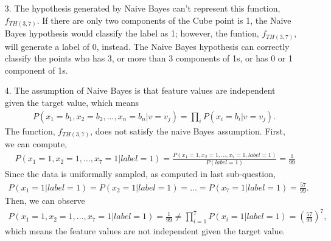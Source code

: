 \documentclass[11pt]{article}
\begin{document}
\begin{itemize}
\item[3.] The hypothesis generated by Naive Bayes can't represent this function, $f_{TH(3,7)}$. If there are only two components of the Cube point is 1, the Naive Bayes hypothesis would classify the label as 1; however, the funtion, $f_{TH(3,7)}$, will generate a label of 0, instead. The Naive Bayes hypothesis can correctly classify the points who has 3, or more than 3 components of 1s, or has 0 or 1 component of 1s.

\item[4.] The assumption of Naive Bayes is that feature values are independent given the target value, which means
\begin{align*}
& P(x_1=b_1,x_2=b_2,...,x_n=b_n|v=v_j)=\prod_i P(x_i=b_i|v=v_j).
\end{align*}
The function, $f_{TH(3,7)}$, does not satisfy the naive Bayes assumption. First, we can compute,
\begin{align*}
&P(x_1=1,x_2=1,...,x_7=1|label=1) = \frac{P(x_1=1,x_2=1,...,x_7=1, label=1)}{P(label=1)}=\frac{1}{99}
\end{align*}
Since the data is uniformally sampled, as computed in last sub-question,
\begin{align*}
P(x_1=1|label=1) = P(x_2=1|label=1)=...=P(x_7=1|label=1)=\frac{57}{99}.
\end{align*}
Then, we can observe 
\begin{align*}
P(x_1=1,x_2=1,...,x_7=1|label=1) =\frac{1}{99} \neq \prod_{i=1}^{7} P(x_i=1|label=1)=(\frac{57}{99})^7,
\end{align*}
which means the feature values are not independent given the target value.
\end{itemize}

%
%
\end{document}

